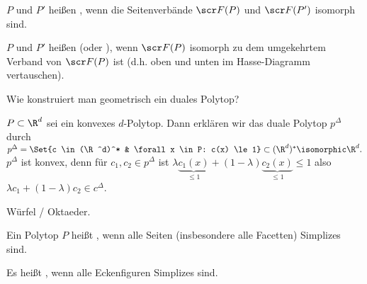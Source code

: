 \begin{df}
    $P$ und $P'$ heißen , wenn die Seitenverbände $\scr F(P)$ und $\scr F(P')$ isomorph sind.

    $P$ und $P'$ heißen  (oder ), wenn $\scr F(P)$ isomorph zu dem umgekehrtem Verband von $\scr F(P)$ ist (d.h. oben und unten im Hasse-Diagramm vertauschen).
\end{df}

Wie konstruiert man geometrisch ein duales Polytop?

\begin{df}
    $P \subset \R^d$ sei ein konvexes $d$-Polytop.
    Dann erklären wir das duale Polytop $p^\Delta$ durch
    \begin{math}
        p^\Delta = \Set{c \in (\R^d)^* & \forall x \in P: c(x) \le 1}
        \subset (\R^d)^* \isomorphic \R^d.
    \end{math}
    $p^\Delta$ ist konvex, denn für $c_1, c_2 \in p^\Delta$ ist
    \begin{math}
        \lambda \underbrace{c_1(x)}_{\le 1} + (1-\lambda)\underbrace{c_2(x)}_{\le 1} \le 1
    \end{math}
    also $\lambda c_1 + (1-\lambda) c_2 \in c^\Delta$.
\end{df}

\begin{ex}
    Würfel / Oktaeder.
\end{ex}

\begin{df}
    Ein Polytop $P$ heißt , wenn alle Seiten (insbesondere alle Facetten) Simplizes sind.

    Es heißt , wenn alle Eckenfiguren Simplizes sind.
\end{df}


